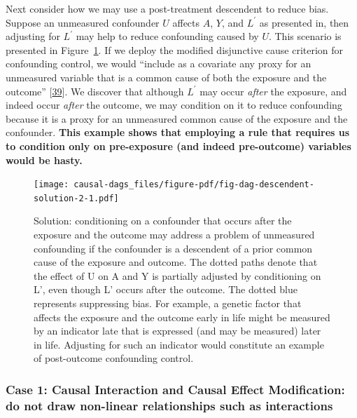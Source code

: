 \documentclass[
  singlecolumn]{article}
\begin{document}
Next consider how we may use a post-treatment descendent to reduce bias.
Suppose an unmeasured confounder \(U\) affects \(A\), \(Y\), and
\(L^\prime\) as presented in, then adjusting for \(L^\prime\) may help
to reduce confounding caused by \(U\). This scenario is presented in
Figure~\ref{fig-dag-descendent-solution-2}. If we deploy the modified
disjunctive cause criterion for confounding control, we would ``include
as a covariate any proxy for an unmeasured variable that is a common
cause of both the exposure and the outcome''
{[}\protect\hyperlink{ref-vanderweele2019}{39}{]}. We discover that
although \(L^\prime\) may occur \emph{after} the exposure, and indeed
occur \emph{after} the outcome, we may condition on it to reduce
confounding because it is a proxy for an unmeasured common cause of the
exposure and the confounder. \textbf{This example shows that employing a
rule that requires us to condition only on pre-exposure (and indeed
pre-outcome) variables would be hasty.}

\begin{figure}

{\centering \texttt{[image: causal-dags\_files/figure-pdf/fig-dag-descendent-solution-2-1.pdf]}

}

\caption{\label{fig-dag-descendent-solution-2}Solution: conditioning on
a confounder that occurs after the exposure and the outcome may address
a problem of unmeasured confounding if the confounder is a descendent of
a prior common cause of the exposure and outcome. The dotted paths
denote that the effect of U on A and Y is partially adjusted by
conditioning on L', even though L' occurs after the outcome. The dotted
blue represents suppressing bias. For example, a genetic factor that
affects the exposure and the outcome early in life might be measured by
an indicator late that is expressed (and may be measured) later in life.
Adjusting for such an indicator would constitute an example of
post-outcome confounding control.}

\end{figure}

\hypertarget{case-1-causal-interaction-and-causal-effect-modification-do-not-draw-non-linear-relationships-such-as-interactions}{%
\subsubsection{Case 1: Causal Interaction and Causal Effect
Modification: do not draw non-linear relationships such as
interactions}\label{case-1-causal-interaction-and-causal-effect-modification-do-not-draw-non-linear-relationships-such-as-interactions}}
\end{document}
